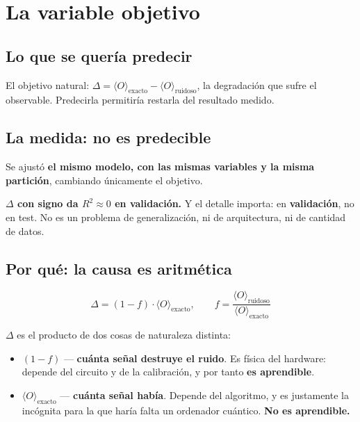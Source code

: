 \chapter{La variable objetivo}
\label{cap:objetivo}

%

\section{Lo que se quería predecir}
\label{sec:delta}
El objetivo natural: $\Delta = \langle O \rangle_{\text{exacto}} - \langle O
\rangle_{\text{ruidoso}}$, la degradación que sufre el observable. Predecirla permitiría
restarla del resultado medido.

\section{La medida: no es predecible}
\label{sec:no_predecible}
Se ajustó \textbf{el mismo modelo, con las mismas variables y la misma partición}, cambiando
únicamente el objetivo.

\textbf{$\Delta$ con signo da $R^2 \approx 0$ en validación.} Y el detalle importa: en
\textbf{validación}, no en test. No es un problema de generalización, ni de arquitectura, ni
de cantidad de datos.

\section{Por qué: la causa es aritmética}
\label{sec:causa}
\begin{equation}
\Delta = (1 - f)\cdot\langle O \rangle_{\text{exacto}}, \qquad
f = \frac{\langle O \rangle_{\text{ruidoso}}}{\langle O \rangle_{\text{exacto}}}
\end{equation}

$\Delta$ es el producto de dos cosas de naturaleza distinta:
\begin{itemize}
    \item $(1-f)$ — \textbf{cuánta señal destruye el ruido}. Es física del hardware: depende
          del circuito y de la calibración, y por tanto \textbf{es aprendible}.
    \item $\langle O \rangle_{\text{exacto}}$ — \textbf{cuánta señal había}. Depende del
          algoritmo, y es justamente la incógnita para la que haría falta un ordenador
          cuántico. \textbf{No es aprendible.}
\end{itemize}

